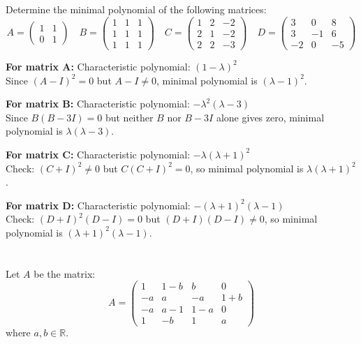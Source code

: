\documentclass[12pt]{article}
\begin{document}
\section{}
Determine the minimal polynomial of the following matrices:
$$A=\begin{pmatrix}1&1\\ 0&1\end{pmatrix} \quad B=\begin{pmatrix}1&1&1\\ 1&1&1\\ 1&1&1\end{pmatrix} \quad C=\begin{pmatrix}1&2&-2\\ 2&1&-2\\ 2&2&-3\end{pmatrix} \quad D=\begin{pmatrix}3&0&8\\ 3&-1&6\\ -2&0&-5\end{pmatrix}$$

\begin{correctionbox}
\textbf{For matrix A:}
Characteristic polynomial: $(1-\lambda)^2$ \\
Since $(A-I)^2 = 0$ but $A-I \ne 0$, minimal polynomial is $(\lambda-1)^2$.

\textbf{For matrix B:}
Characteristic polynomial: $-\lambda^2(\lambda-3)$ \\
Since $B(B-3I) = 0$ but neither $B$ nor $B-3I$ alone gives zero, minimal polynomial is $\lambda(\lambda-3)$.

\textbf{For matrix C:}
Characteristic polynomial: $-\lambda(\lambda+1)^2$ \\
Check: $(C+I)^2 \ne 0$ but $C(C+I)^2 = 0$, so minimal polynomial is $\lambda(\lambda+1)^2$.

\textbf{For matrix D:}
Characteristic polynomial: $-(\lambda+1)^2(\lambda-1)$ \\
Check: $(D+I)^2(D-I) = 0$ but $(D+I)(D-I) \ne 0$, so minimal polynomial is $(\lambda+1)^2(\lambda-1)$.
\end{correctionbox}

\section{}
Let $A$ be the matrix:
$$A = \begin{pmatrix}
1 & 1-b & b & 0 \\
-a & a & -a & 1+b \\
-a & a-1 & 1-a & 0 \\
1 & -b & 1 & a
\end{pmatrix}$$
where $a, b \in \mathbb{R}$.
\end{document}
